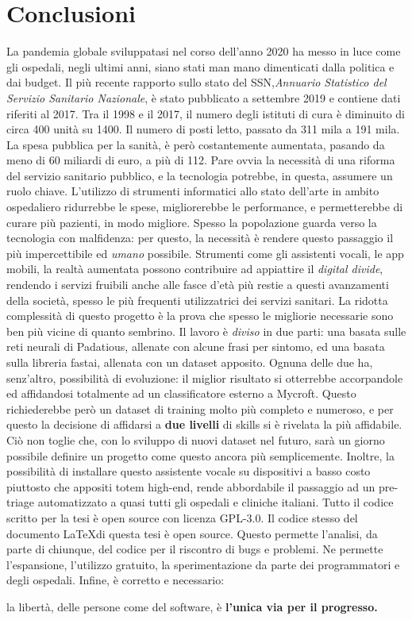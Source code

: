 \chapter{Conclusioni}
\label{chap:conclusioni}
La pandemia globale sviluppatasi nel corso dell'anno 2020 ha messo in luce come gli ospedali, negli ultimi anni, siano stati man mano dimenticati dalla politica e dai budget. Il più recente rapporto sullo stato del SSN,\textit{Annuario Statistico del Servizio Sanitario Nazionale}, è stato pubblicato a settembre 2019 e contiene dati riferiti al 2017.
Tra il 1998 e il 2017, il numero degli istituti di cura è diminuito di circa 400 unità su 1400. Il numero di posti letto, passato da 311 mila a 191 mila. La spesa pubblica per la sanità, è però costantemente aumentata, pasando da meno di 60 miliardi di euro, a più di 112. \cite{article:tagli-ospedali} Pare ovvia la necessità di una riforma del servizio sanitario pubblico, e la tecnologia potrebbe, in questa, assumere un ruolo chiave. L'utilizzo di strumenti informatici allo stato dell'arte in ambito ospedaliero ridurrebbe le spese, migliorerebbe le performance, e permetterebbe di curare più pazienti, in modo migliore.
Spesso la popolazione guarda verso la tecnologia con malfidenza: per questo, la necessità è rendere questo passaggio il più impercettibile ed \textit{umano} possibile. Strumenti come gli assistenti vocali, le app mobili, la realtà aumentata possono contribuire ad appiattire il \textit{digital divide}, rendendo i servizi fruibili anche alle fasce d'età più restie a questi avanzamenti della società, spesso le più frequenti utilizzatrici dei servizi sanitari.
La ridotta complessità di questo progetto è la prova che spesso le migliorie necessarie sono ben più vicine di quanto sembrino.
Il lavoro è \textit{diviso} in due parti: una basata sulle reti neurali di Padatious, allenate con alcune frasi per sintomo, ed una basata sulla libreria fastai, allenata con un dataset apposito. Ognuna delle due ha, senz'altro, possibilità di evoluzione: il miglior risultato si otterrebbe accorpandole ed affidandosi totalmente ad un classificatore esterno a Mycroft. Questo richiederebbe però un dataset di training molto più completo e numeroso, e per questo la decisione di affidarsi a \textbf{due livelli} di skills si è rivelata la più affidabile. Ciò non toglie che, con lo sviluppo di nuovi dataset nel futuro, sarà un giorno possibile definire un progetto come questo ancora più semplicemente.
Inoltre, la possibilità di installare questo assistente vocale su dispositivi a basso costo piuttosto che appositi totem high-end, rende abbordabile il passaggio ad un pre-triage automatizzato a quasi tutti gli ospedali e cliniche italiani.
Tutto il codice scritto per la tesi è open source con licenza GPL-3.0. Il codice stesso del documento \LaTeX di questa tesi è open source.
Questo permette l'analisi, da parte di chiunque, del codice per il riscontro di bugs e problemi. Ne permette l'espansione, l'utilizzo gratuito, la sperimentazione da parte dei programmatori e degli ospedali. Infine, è corretto e necessario:
\begin{center}
    la libertà, delle persone come del software, è \textbf{l'unica via per il progresso.}
\end{center}
